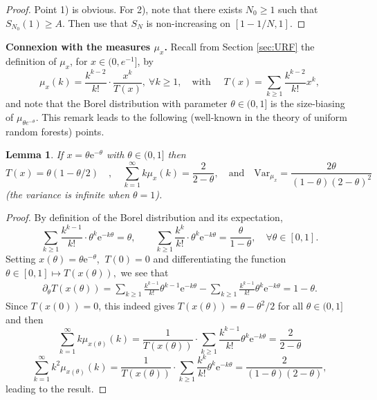 \documentclass[a4, 11pt]{article}
\numberwithin{equation}{section}
\theoremstyle{plain}
\newtheorem{lemma}[theorem]{Lemma}
\theoremstyle{definition}
\theoremstyle{remark}
\begin{document}
\begin{proof} Point 1) is obvious. For 2), note that there exists $N_0\geq 1$ such that $S_{N_0}(1)\geq A.$ Then use that $S_N$ is non-increasing on $\left[1-1/N,1\right]$. \end{proof}	

\bigskip

\textbf{Connexion with the measures $\mu_x$. }
Recall from Section \ref{sec:URF} the definition of $\mu_x$, for $x\in(0,e^{-1}]$, by
$$
\mu_x(k)=\frac{k^{k-2}}{k!} \cdot \frac{x^k}{T(x)}, ~ \forall k \geq 1, \quad \text{with } \quad T(x)=\sum_{k\geq 1} \frac{k^{k-2}}{k!} x^k,
$$
and note that the Borel distribution with parameter $\theta \in (0,1]$ is the size-biasing of $\mu_{\theta e^{-\theta}}$. This remark leads to the following (well-known in the theory of uniform random forests) points.

\medskip

\begin{lemma}\label{lm:lambert_fct}
	If $x=\theta\mathrm{e}^{-\theta}$ with $\theta\in (0,1]$ then
	 $$T(x)=\theta\left(1-\theta/2\right) \quad, \quad \sum_{k=1}^{\infty} k\mu_x(k)=\frac{2}{2-\theta}, \quad \text{and} \quad \mathrm{Var}_{\mu_x}=\frac{2\theta}{(1-\theta)(2-\theta)^2}$$
	\emph{(}the variance is infinite when $\theta=1$\emph{)}. 
\end{lemma} 

\begin{proof}
By definition of the Borel distribution and its expectation,
$$\sum_{k\geq 1}\frac{k^{k-1}}{k!}\cdot \theta^{k}\mathrm{e}^{-k\theta}=\theta,  \qquad \sum_{k\geq 1}\frac{k^{k}}{k!}\cdot \theta^{k}\mathrm{e}^{-k\theta}=\frac{\theta}{1-\theta}, \quad  \forall \theta \in [0,1].$$
Setting $x(\theta)=\theta\mathrm{e}^{-\theta}$, $~T(0)=0$ and differentiating the function
$
\theta \in [0,1] \mapsto T(x(\theta)),
$
we see that 
\begin{eqnarray*}
\partial_{\theta} T(x(\theta))=\sum_{k\geq 1}\frac{k^{k-1}}{k!}\theta^{k-1}\mathrm{e}^{-k\theta}-\sum_{k\geq 1}\frac{k^{k-1}}{k!}\theta^{k}\mathrm{e}^{-k\theta} = 1-\theta.
\end{eqnarray*}
Since $T(x(0))=0$, this indeed gives $T(x(\theta))=\theta-\theta^2/2$ for all $\theta \in (0,1]$ and then 
$$
\sum_{k=1}^{\infty} k\mu_{x(\theta)}(k)=\frac{1}{T(x(\theta))} \cdot \sum_{k\geq 1}\frac{k^{k-1}}{k!}\theta^{k}\mathrm{e}^{-k\theta}=\frac{2}{2-\theta}
$$
$$
\sum_{k=1}^{\infty} k^2\mu_{x(\theta)}(k)=\frac{1}{T(x(\theta))} \cdot \sum_{k\geq 1}\frac{k^{k}}{k!}\theta^{k}\mathrm{e}^{-k\theta}=\frac{2}{(1-\theta)(2-\theta)},
$$
leading to the result.
\end{proof}
\end{document}
